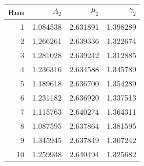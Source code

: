 \begin{tabular}{rrrr}
\toprule
 Run &     $A_2$ &   $\mu_2$ &  $\gamma_2$ \\
\midrule
   1 &  1.084538 &  2.631891 &    1.398289 \\
   2 &  1.266261 &  2.639336 &    1.322674 \\
   3 &  1.281028 &  2.639242 &    1.312885 \\
   4 &  1.236316 &  2.634588 &    1.345789 \\
   5 &  1.189618 &  2.636700 &    1.354289 \\
   6 &  1.231182 &  2.636920 &    1.337513 \\
   7 &  1.115763 &  2.640274 &    1.364311 \\
   8 &  1.087595 &  2.637864 &    1.381595 \\
   9 &  1.345945 &  2.637849 &    1.307242 \\
  10 &  1.259938 &  2.640494 &    1.325682 \\
\bottomrule
\end{tabular}
